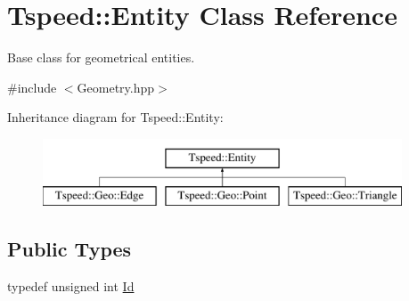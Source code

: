 \hypertarget{classTspeed_1_1Entity}{\section{Tspeed\-:\-:Entity Class Reference}
\label{classTspeed_1_1Entity}
}


Base class for geometrical entities.  




{\ttfamily \#include $<$Geometry.\-hpp$>$}

Inheritance diagram for Tspeed\-:\-:Entity\-:\begin{figure}[H]
\begin{center}
\leavevmode
\includegraphics[height=2.000000cm]{classTspeed_1_1Entity}
\end{center}
\end{figure}
\subsection*{Public Types}
\begin{DoxyCompactItemize}
\item 
typedef unsigned int \hyperlink{classTspeed_1_1Entity_a32da920d1e9397a793b67beadd70e8fe}{Id}
\end{DoxyCompactItemize}
